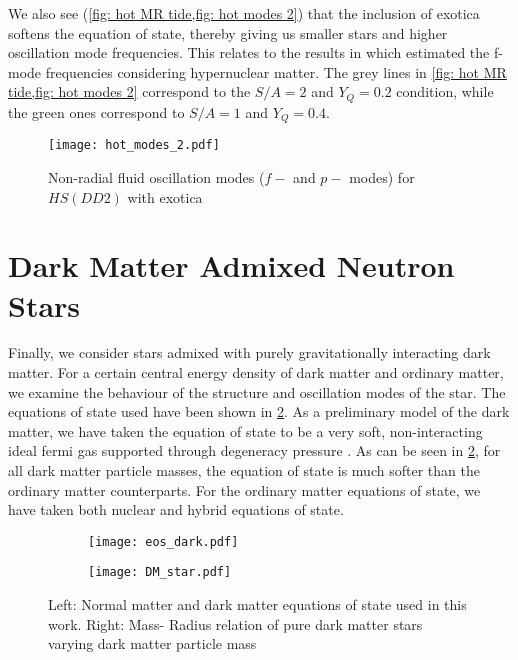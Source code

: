 \documentclass[a4paper,12pt,onehalfspacing]{report}
\begin{document}
We also see (\cref{fig: hot MR tide,fig: hot modes 2}) that the inclusion of exotica softens the equation of state, thereby giving us smaller stars and higher oscillation mode frequencies. This relates to the results in \cite{PhysRevC.103.035810} which estimated the f-mode frequencies considering hypernuclear matter. The grey lines in \cref{fig: hot MR tide,fig: hot modes 2} correspond to the $S/A = 2$ and $Y_Q= 0.2$ condition, while the green ones correspond to $S/A = 1$ and $Y_Q= 0.4$. 

\begin{figure}[ht]
    \centering
    \texttt{[image: hot\_modes\_2.pdf]}
    \caption{Non-radial fluid oscillation modes ($f-$ and $p-$ modes) for $HS(DD2)$ with exotica}
    \label{fig: hot modes 2}
\end{figure}

\FloatBarrier

\section{Dark Matter Admixed Neutron Stars}

Finally, we consider stars admixed with purely gravitationally interacting dark matter. For a certain central energy density of dark matter and ordinary matter, we examine the behaviour of the structure and oscillation modes of the star. The equations of state used have been shown in \cref{fig: DM eos MR}. As a preliminary model of the dark matter, we have taken the equation of state to be a very soft, non-interacting ideal fermi gas supported through degeneracy pressure \cite{Payel_M_DM}. As can be seen in \cref{fig: DM eos MR}, for all dark matter particle masses, the equation of state is much softer than the ordinary matter counterparts. For the ordinary matter equations of state, we have taken both nuclear and hybrid equations of state. 

\begin{figure}[ht]
    \centering
    \begin{subfigure}{0.5\textwidth}
      \centering
      \texttt{[image: eos\_dark.pdf]}
    \end{subfigure}%
    \begin{subfigure}{0.5\textwidth}
      \centering
      \texttt{[image: DM\_star.pdf]}
    \end{subfigure}
    \caption{Left: Normal matter and dark matter equations of state used in this work. Right: Mass- Radius relation of pure dark matter stars varying dark matter particle mass}
    \label{fig: DM eos MR}
\end{figure}
\end{document}

